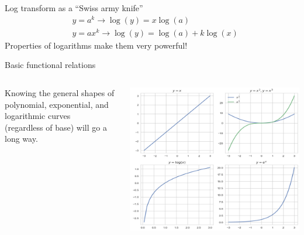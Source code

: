 \documentclass[aspectratio=169]{../latex_main/tntbeamer}  %
\begin{document}
	
	
	\begin{frame}{Log transform as a “Swiss army knife”}
	    \begin{align*}
	        &y = a^k \rightarrow \log (y) = x\log (a)\\
	        &y = ax^k \rightarrow \log (y) = \log (a) + k\log (x)
	    \end{align*}
	    Properties of logarithms make them very powerful!
	\end{frame}
	
	
	
	\begin{frame}{Basic functional relations}
	    \begin{columns}
	        \begin{column}{.5\textwidth}

	               Knowing the general shapes of polynomial, exponential, and logarithmic curves\\ (regardless of base) will go a long way.
	               
	        \end{column}
	        
	        
	        \begin{column}{.5\textwidth}
	        
	                   \centering
	                   \includegraphics[scale=.35]{Bild98}

	        \end{column}
	    \end{columns}
	\end{frame}
	
\end{document}
